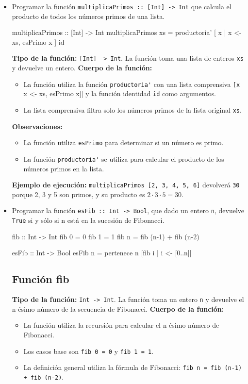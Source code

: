 \documentclass{article}
\begin{document}
\begin{itemize}
    \item 
Programar la función \verb|multiplicaPrimos :: [Int] -> Int| que calcula el producto de todos los números primos de una lista.
\begin{haskell}
multiplicaPrimos :: [Int] -> Int
multiplicaPrimos xs = productoria' [ x | x <- xs, esPrimo x ] id
\end{haskell}
\textbf{Tipo de la función:} \verb|[Int] -> Int|. La función toma una lista de enteros \verb|xs| y devuelve un entero.
\textbf{Cuerpo de la función:}
\begin{itemize}
\item La función utiliza la función \verb|productoria'| con una lista comprensiva \verb|[x | x <- xs, esPrimo x]| y la función identidad \verb|id| como argumentos.
\item La lista comprensiva filtra solo los números primos de la lista original \verb|xs|.
\end{itemize}
\textbf{Observaciones:}
\begin{itemize}
\item La función utiliza \verb|esPrimo| para determinar si un número es primo.
\item La función \verb|productoria'| se utiliza para calcular el producto de los números primos en la lista.
\end{itemize}
\textbf{Ejemplo de ejecución:} \verb|multiplicaPrimos [2, 3, 4, 5, 6]| devolverá \verb|30| porque 2, 3 y 5 son primos, y su producto es $2 \cdot 3 \cdot 5 = 30$.

    \item 
Programar la función \verb|esFib :: Int -> Bool|, que dado un entero \verb|n|, devuelve \verb|True| si y sólo si n está en la sucesión de Fibonacci.
\begin{haskell}
fib :: Int -> Int
fib 0 = 0
fib 1 = 1
fib n = fib (n-1) + fib (n-2)

esFib :: Int -> Bool
esFib n = pertenece n [fib i | i <- [0..n]]
\end{haskell}
\subsection*{Función fib}
\textbf{Tipo de la función:} \verb|Int -> Int|. La función toma un entero \verb|n| y devuelve el n-ésimo número de la secuencia de Fibonacci.
\textbf{Cuerpo de la función:}
\begin{itemize}
\item La función utiliza la recursión para calcular el n-ésimo número de Fibonacci.
\item Los casos base son \verb|fib 0 = 0| y \verb|fib 1 = 1|.
\item La definición general utiliza la fórmula de Fibonacci: \verb|fib n = fib (n-1) + fib (n-2)|.
\end{itemize}

\end{itemize}
\end{document}

